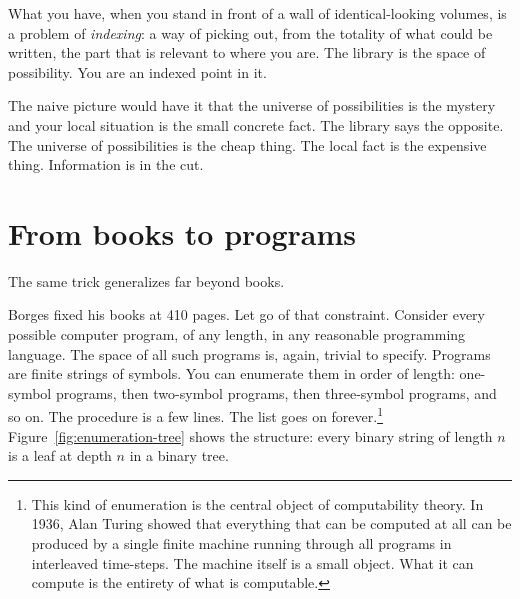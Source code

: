 What you have, when you stand in front of a wall of identical-looking volumes, is a problem of \emph{indexing}: a way of picking out, from the totality of what could be written, the part that is relevant to where you are. The library is the space of possibility. You are an indexed point in it.

The naive picture would have it that the universe of possibilities is the mystery and your local situation is the small concrete fact. The library says the opposite. The universe of possibilities is the cheap thing. The local fact is the expensive thing. Information is in the cut.

\section*{From books to programs}

The same trick generalizes far beyond books.

Borges fixed his books at 410 pages. Let go of that constraint. Consider every possible computer program, of any length, in any reasonable programming language. The space of all such programs is, again, trivial to specify. Programs are finite strings of symbols. You can enumerate them in order of length: one-symbol programs, then two-symbol programs, then three-symbol programs, and so on. The procedure is a few lines. The list goes on forever.\footnote{This kind of enumeration is the central object of computability theory. In 1936, Alan Turing showed that everything that can be computed at all can be produced by a single finite machine running through all programs in interleaved time-steps. The machine itself is a small object. What it can compute is the entirety of what is computable.} Figure~\ref{fig:enumeration-tree} shows the structure: every binary string of length $n$ is a leaf at depth $n$ in a binary tree.

